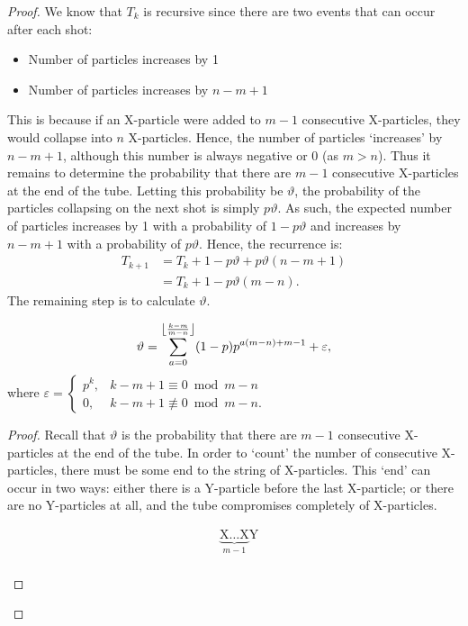 \begin{proof}
  We know that $T_k$ is recursive since there are two events that can occur after each shot:
  \begin{itemize}
    \item Number of particles increases by 1
    \item Number of particles increases by $n-m+1$
  \end{itemize}
  This is because if an X-particle were added to $m-1$ consecutive X-particles, they would collapse into $n$ X-particles. Hence, the number of particles `increases' by $n-m+1$, although this number is always negative or 0 (as $m > n$). Thus it remains to determine the probability that there are $m-1$ consecutive X-particles at the end of the tube. Letting this probability be $\vartheta$, the probability of the particles collapsing on the next shot is simply $p\vartheta$. As such, the expected number of particles increases by 1 with a probability of  $1-p\vartheta$ and increases by  $n-m+1$ with a probability of $p\vartheta$. Hence, the recurrence is:
  \begin{align}
    T_{k+1} &= T_{k} + 1 - p\vartheta + p\vartheta(n-m+1) \nonumber \\
            &= T_{k} + 1 - p\vartheta(m-n). \label{eq:1}
  \end{align}
  The remaining step is to calculate $\vartheta$.
  \begin{claim}
    \begin{equation*}
      \vartheta = \sum_{a=0}^{\floor*{\frac{k-m}{m-n}}} (1-p)p^{a(m-n)+m-1} + \varepsilon,
    \end{equation*}
    where $\varepsilon = \begin{cases} p^{k}, &k-m+1 \equiv 0 \bmod m-n \\ 0, &k-m+1 \not\equiv 0 \bmod m-n. \end{cases}$
  \end{claim}
  \begin{proof}
    Recall that $\vartheta$ is the probability that there are $m-1$ consecutive X-particles at the end of the tube. In order to `count' the number of consecutive X-particles, there must be some end to the string of X-particles. This `end' can occur in two ways: either there is a Y-particle before the last X-particle; or there are no Y-particles at all, and the tube compromises completely of X-particles.
    \begin{figure}[H]
      \vspace{-1.5em}
      \begin{align*}
        &\underbrace{\text{X}\dots\text{X}}_{m-1}\text{Y} \tag{A}\\

\end{align*}
\end{figure}
\end{proof}
\end{proof}

